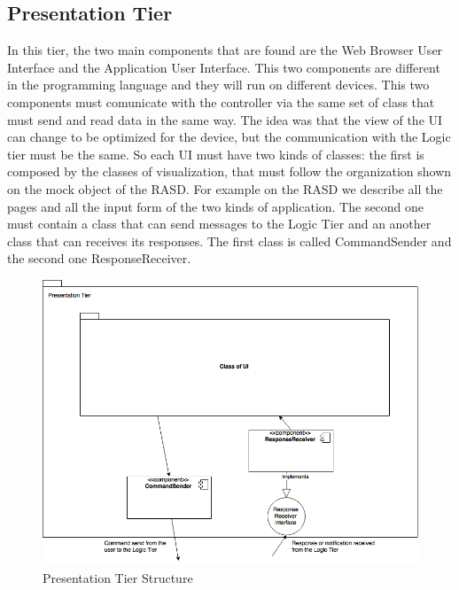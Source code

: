 \documentclass[../../../../../../dd.tex]{subfiles}
\begin{document}
	\subsection{Presentation Tier}
		In this tier, the two main components that are found are the Web Browser User Interface and the Application User Interface. This two components are different in the programming language and they will run on different devices. This two components must comunicate with the controller via the same set of class that must send and read data in the same way. The idea was that the view of the UI can change to be optimized for the device, but the communication with the Logic tier must be the same. So each UI must have two kinds of classes: the first is composed by the classes of visualization, that must follow the organization shown on the mock object of the RASD. For example on the RASD we describe all the pages and all the input form of the two kinds of application. The second one must contain a class that can send messages to the Logic Tier and an another class that can receives its responses. The first class is called CommandSender and the second one ResponseReceiver.

		\begin{figure}[H]
				\centering
				\includegraphics[width=\textwidth, scale=0.5]{../images/PresentationTier.png}
			\caption{Presentation Tier Structure}\label{fig:PresTier}
		\end{figure}
	
\end{document}
